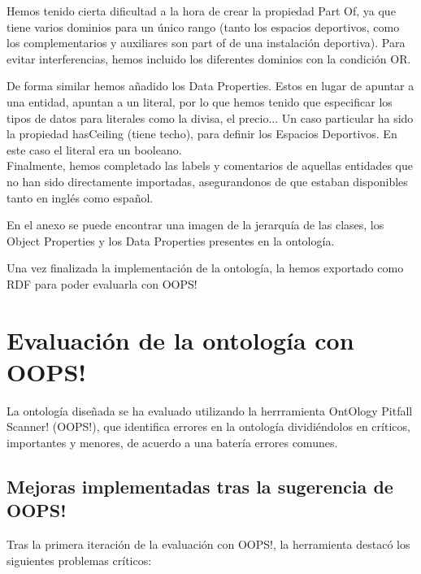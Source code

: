 \documentclass[a4paper,12pt]{article}
\begin{document}
	Hemos tenido cierta dificultad a la hora de crear la propiedad Part Of, ya que tiene varios dominios para un único rango (tanto los espacios deportivos, como los complementarios y auxiliares son part of de una instalación deportiva). Para evitar interferencias, hemos incluido los diferentes dominios con la condición OR. 
	
	De forma similar hemos añadido los Data Properties. Estos en lugar de apuntar a una entidad, apuntan a un literal, por lo que hemos tenido que especificar los tipos de datos para literales como la divisa, el precio... Un caso particular ha sido la propiedad hasCeiling (tiene techo), para definir los Espacios Deportivos. En este caso el literal era un booleano.
\\
	
	Finalmente, hemos completado las labels y comentarios de aquellas entidades que no han sido directamente importadas, asegurandonos de que estaban disponibles tanto en inglés como español. 
	
	En el anexo se puede encontrar una imagen de la jerarquía de las clases, los Object Properties y los Data Properties presentes en la ontología.
	
	Una vez finalizada la implementación de la ontología, la hemos exportado como RDF para poder evaluarla con OOPS!
	
	\section{Evaluación de la ontología con OOPS!}
	La ontología diseñada se ha evaluado utilizando la herrramienta OntOlogy Pitfall Scanner! (OOPS!)\cite{oops}, que identifica errores en la ontología dividiéndolos en críticos, importantes y menores, de acuerdo a una batería errores comunes.
	
	\subsection{Mejoras implementadas tras la sugerencia de OOPS!}
	
	Tras la primera iteración de la evaluación con OOPS!, la herramienta destacó los siguientes problemas críticos:
	
\end{document}
